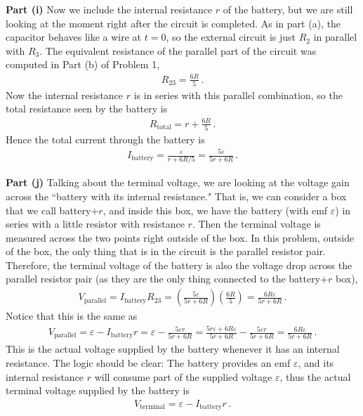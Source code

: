 \documentclass[11pt]{article}
\begin{document}
\noindent\textbf{Part (i)} Now we include the internal resistance $r$ of the battery, but we are still looking at the moment right after the circuit is completed. As in part (a), the capacitor behaves like a wire at $t=0$, so the external circuit is just $R_2$ in parallel with $R_3$. The equivalent resistance of the parallel part of the circuit was computed in Part (b) of Problem 1,
\begin{align*}
R_{23} = \frac{6R}{5}\,.
\end{align*}
Now the internal resistance $r$ is in series with this parallel combination, so the total resistance seen by the battery is
\begin{align*}
R_{\text{total}} = r+\frac{6R}{5}\,.
\end{align*}
Hence the total current through the battery is
\begin{align*}
I_{\text{battery}} = \frac{\varepsilon}{r+6R/5}
= \frac{5\varepsilon}{5r+6R}\,.
\end{align*}

\noindent\textbf{Part (j)} Talking about the terminal voltage, we are looking at the voltage gain across the ``battery with its internal resistance." That is, we can consider a box that we call battery$+r$, and inside this box, we have the battery (with emf $\varepsilon$) in series with a little resistor with resistance $r$. Then the terminal voltage is measured across the two points right outside of the box. In this problem, outside of the box, the only thing that is in the circuit is the parallel resistor pair. Therefore, the terminal voltage of the battery is also the voltage drop across the parallel resistor pair (as they are the only thing connected to the battery$+r$ box),
\begin{align*}
V_{\text{parallel}} = I_{\text{battery}}R_{23}
= \left(\frac{5\varepsilon}{5r+6R}\right)\left(\frac{6R}{5}\right)
= \frac{6R\varepsilon}{5r+6R}\,.
\end{align*}
Notice that this is the same as
\begin{align*}
V_{\text{parallel}} = \varepsilon - I_{\text{battery}}r = \varepsilon - \frac{5\varepsilon r}{5r+6R} = \frac{5r\varepsilon + 6R\varepsilon}{5r+6R} - \frac{5\varepsilon r}{5r+6R} = \frac{6R\varepsilon}{5r+6R}\,.
\end{align*}
This is the actual voltage supplied by the battery whenever it has an internal resistance. The logic should be clear: The battery provides an emf $\varepsilon$, and its internal resistance $r$ will consume part of the supplied voltage $\varepsilon$, thus the actual terminal voltage supplied by the battery is 
\begin{align*}
V_{\text{terminal}} = \varepsilon - I_{\text{battery}}r\,.
\end{align*}
\end{document}
